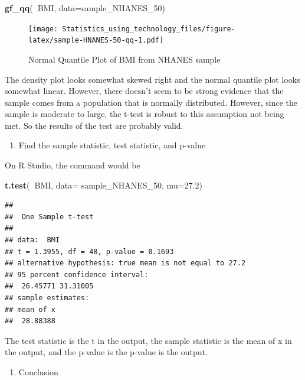 \documentclass[]{book}
\newenvironment{Shaded}{\begin{snugshade}}{\end{snugshade}}
\newcommand{\DataTypeTok}[1]{\textcolor[rgb]{0.13,0.29,0.53}{#1}}
\newcommand{\DecValTok}[1]{\textcolor[rgb]{0.00,0.00,0.81}{#1}}
\newcommand{\FloatTok}[1]{\textcolor[rgb]{0.00,0.00,0.81}{#1}}
\newcommand{\KeywordTok}[1]{\textcolor[rgb]{0.13,0.29,0.53}{\textbf{#1}}}
\newcommand{\NormalTok}[1]{#1}
\newcommand{\OperatorTok}[1]{\textcolor[rgb]{0.81,0.36,0.00}{\textbf{#1}}}
\providecommand{\tightlist}{%
  \setlength{\itemsep}{0pt}\setlength{\parskip}{0pt}}
\begin{document}
\begin{Shaded}
\begin{Highlighting}[]
\KeywordTok{gf_qq}\NormalTok{(}\OperatorTok{~}\NormalTok{BMI, }\DataTypeTok{data=}\NormalTok{sample_NHANES_}\DecValTok{50}\NormalTok{)}
\end{Highlighting}
\end{Shaded}

\begin{figure}
\centering
\texttt{[image: Statistics\_using\_technology\_files/figure-latex/sample-HNANES-50-qq-1.pdf]}
\caption{\label{fig:sample-HNANES-50-qq}Normal Quantile Plot of BMI from NHANES sample}
\end{figure}

The density plot looks somewhat skewed right and the normal quantile plot looks somewhat linear. However, there doesn't seem to be strong evidence that the sample comes from a population that is normally distributed. However, since the sample is moderate to large, the t-test is robust to this assumption not being met. So the results of the test are probably valid.

\begin{enumerate}
\def\labelenumi{\arabic{enumi}.}
\setcounter{enumi}{3}
\tightlist
\item
  Find the sample statistic, test statistic, and p-value
\end{enumerate}

On R Studio, the command would be

\begin{Shaded}
\begin{Highlighting}[]
\KeywordTok{t.test}\NormalTok{(}\OperatorTok{~}\NormalTok{BMI, }\DataTypeTok{data=}\NormalTok{ sample_NHANES_}\DecValTok{50}\NormalTok{, }\DataTypeTok{mu=}\FloatTok{27.2}\NormalTok{)}
\end{Highlighting}
\end{Shaded}

\begin{verbatim}
## 
##  One Sample t-test
## 
## data:  BMI
## t = 1.3955, df = 48, p-value = 0.1693
## alternative hypothesis: true mean is not equal to 27.2
## 95 percent confidence interval:
##  26.45771 31.31005
## sample estimates:
## mean of x 
##  28.88388
\end{verbatim}

The test statistic is the t in the output, the sample statistic is the mean of x in the output, and the p-value is the p-value is the output.

\begin{enumerate}
\def\labelenumi{\arabic{enumi}.}
\setcounter{enumi}{4}
\tightlist
\item
  Conclusion
\end{enumerate}
\end{document}
